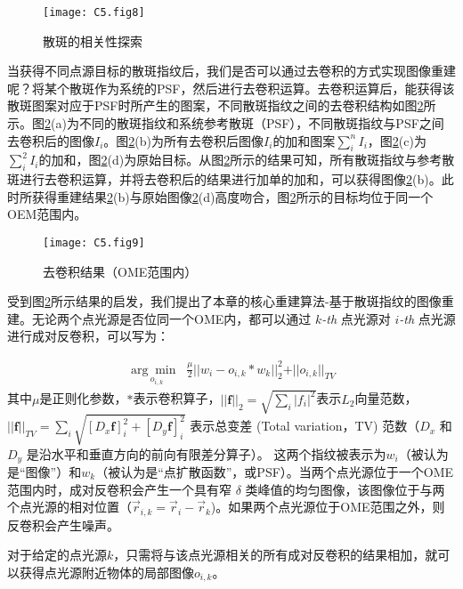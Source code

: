\begin{figure}[htp]
	\centering
	\texttt{[image: C5.fig8]}
	\caption{散斑的相关性探索}
	\label{fig:5.8}
\end{figure}

当获得不同点源目标的散斑指纹后，我们是否可以通过去卷积的方式实现图像重建呢？将某个散斑作为系统的PSF，然后进行去卷积运算\cite{biggs_acceleration_1997}。去卷积运算后，能获得该散斑图案对应于PSF时所产生的图案，不同散斑指纹之间的去卷积结构如图\ref{fig:5.9}所示。图\ref{fig:5.9}(a)为不同的散斑指纹和系统参考散斑（PSF），不同散斑指纹与PSF之间去卷积后的图像$I_{i}$。图\ref{fig:5.9}(b)为所有去卷积后图像$I_{i}$的加和图案$\sum_{i}^{n} I_{i}$，图\ref{fig:5.9}(c)为$\sum_{i}^{2} I_{i}$的加和，图\ref{fig:5.9}(d)为原始目标。从图\ref{fig:5.9}所示的结果可知，所有散斑指纹与参考散斑进行去卷积运算，并将去卷积后的结果进行加单的加和，可以获得图像\ref{fig:5.9}(b)。此时所获得重建结果\ref{fig:5.9}(b)与原始图像\ref{fig:5.9}(d)高度吻合，图\ref{fig:5.9}所示的目标均位于同一个OEM范围内。

\begin{figure}[htp]
	\centering
	\texttt{[image: C5.fig9]}
	\caption{去卷积结果（OME范围内）}
	\label{fig:5.9}
\end{figure}

受到图\ref{fig:5.9}所示结果的启发，我们提出了本章的核心重建算法-基于散斑指纹的图像重建。无论两个点光源是否位同一个OME内，都可以通过 $k$\textsl{-th} 点光源对 $i$\textsl{-th} 点光源进行成对反卷积，可以写为：

\begin{equation}
	\begin{aligned}
\underset{o_{i,k}}{\arg\min \;\;}
\frac{\mu}{2} \vert\vert w_{i}-o_{i,k}* w_{k}\vert\vert^2_{2}+\vert\vert o_{i,k}\vert\vert_{TV}
\label{eq:5.4}
\end{aligned}
\end{equation}
其中$\mu$是正则化参数，$*$表示卷积算子，$\vert\vert \mathbf{f}\vert\vert_2 = \sqrt{\sum_{i} \vert f_i\vert^2} $表示$L_{2}$向量范数，
$\vert\vert \mathbf{f} \vert\vert_{TV} = \sum_{i}\sqrt{[D_x\mathbf{f}]_i^2 +[D_y\mathbf{f}]_i^2}$ 表示总变差 (Total variation，TV) 范数（$D_x$ 和 $D_y$ 是沿水平和垂直方向的前向有限差分算子）。
这两个指纹被表示为$w_{i}$（被认为是“图像”）和$w_{k}$（被认为是“点扩散函数”，或PSF）。当两个点光源位于一个OME范围内时，成对反卷积会产生一个具有窄 $\delta$ 类峰值的均匀图像，该图像位于与两个点光源的相对位置（$\vec{r} _{i,k} = \vec{r}_i - \vec{r}_k$)。如果两个点光源位于OME范围之外，则反卷积会产生噪声。

对于给定的点光源$k$，只需将与该点光源相关的所有成对反卷积的结果相加，就可以获得点光源附近物体的局部图像$o_{i,k}$。

